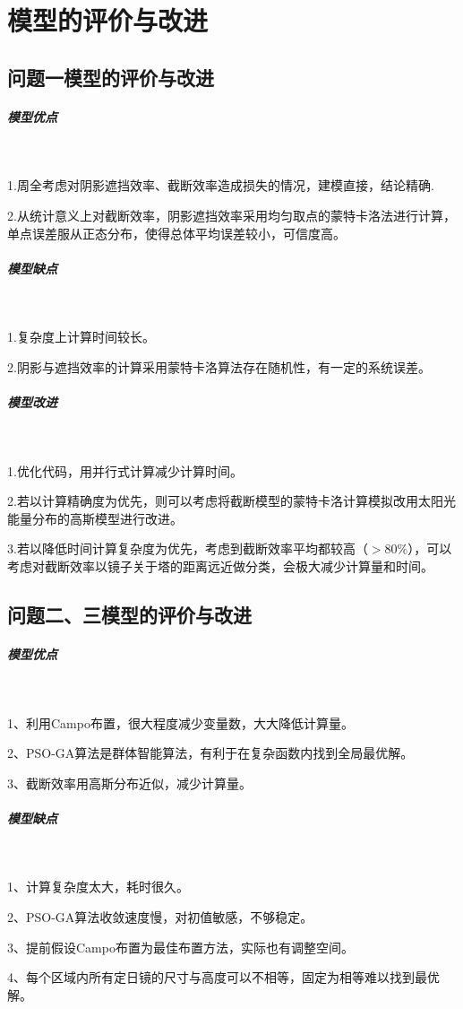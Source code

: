 \documentclass{article}
\numberwithin{equation}{subsection}
\begin{document}
\newpage

{\centering\section{模型的评价与改进}}

\subsection{问题一模型的评价与改进}

\subparagraph{模型优点}~

1.周全考虑对阴影遮挡效率、截断效率造成损失的情况，建模直接，结论精确.

2.从统计意义上对截断效率，阴影遮挡效率采用均匀取点的蒙特卡洛法进行计算，单点误差服从正态分布，使得总体平均误差较小，可信度高。

\subparagraph{模型缺点}~

1.复杂度上计算时间较长。

2.阴影与遮挡效率的计算采用蒙特卡洛算法存在随机性，有一定的系统误差。

\subparagraph{模型改进}~

1.优化代码，用并行式计算减少计算时间。

2.若以计算精确度为优先，则可以考虑将截断模型的蒙特卡洛计算模拟改用太阳光能量分布的高斯模型进行改进。

3.若以降低时间计算复杂度为优先，考虑到截断效率平均都较高（$>80\%$），可以考虑对截断效率以镜子关于塔的距离远近做分类，会极大减少计算量和时间。


\subsection{问题二、三模型的评价与改进}

\subparagraph{模型优点}~

1、利用Campo布置，很大程度减少变量数，大大降低计算量。

2、PSO-GA算法是群体智能算法，有利于在复杂函数内找到全局最优解。

3、截断效率用高斯分布近似，减少计算量。

\subparagraph{模型缺点}~

1、计算复杂度太大，耗时很久。

2、PSO-GA算法收敛速度慢，对初值敏感，不够稳定。

3、提前假设Campo布置为最佳布置方法，实际也有调整空间。

4、每个区域内所有定日镜的尺寸与高度可以不相等，固定为相等难以找到最优解。
\end{document}
